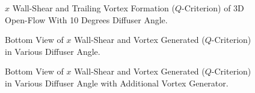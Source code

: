 \begin{figure}[!htb]
    \centering
    \noindent{}
    \caption{$x$ Wall-Shear and Trailing Vortex Formation ($Q$-Criterion) of 3D Open-Flow With 10 Degrees Diffuser Angle.}
    \label{fig:3D_OF_ISO_COMPARE}
\end{figure}
\begin{figure}
    \centering
    \noindent{}
    \caption{Bottom View of $x$ Wall-Shear and Vortex Generated ($Q$-Criterion) in Various Diffuser Angle.}
    \label{fig:3D_OF_BOTTOM_VIEW_COMPARE_DIFF}
\end{figure}

\begin{figure}
    \centering
    \noindent{}
    \caption{Bottom View of $x$ Wall-Shear and Vortex Generated ($Q$-Criterion) in Various Diffuser Angle with Additional Vortex Generator.}
    \label{fig:3D_OF_BOTTOM_VIEW_COMPARE_DIFF_F}
\end{figure}

